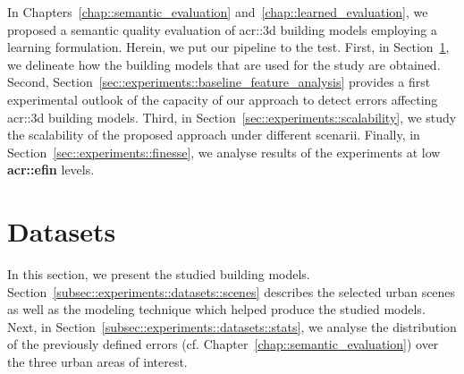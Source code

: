 \minitoc

\vfill

In Chapters~\ref{chap::semantic_evaluation} and~\ref{chap::learned_evaluation}, we proposed a semantic quality evaluation of \gls{acr::3d} building models employing a learning formulation.
Herein, we put our pipeline to the test.
First, in Section~\ref{sec::experiments::datasets}, we delineate how the building models that are used for the study are obtained.
Second, Section~\ref{sec::experiments::baseline_feature_analysis} provides a first experimental outlook of the capacity of our approach to detect errors affecting \gls{acr::3d} building models.
Third, in Section~\ref{sec::experiments::scalability}, we study the scalability of the proposed approach under different scenarii.
Finally, in Section~\ref{sec::experiments::finesse}, we analyse results of the experiments at low \textbf{\gls{acr::efin}} levels.

\clearpage

\section{Datasets}
    \label{sec::experiments::datasets}
    In this section, we present the studied building models.
    Section~\ref{subsec::experiments::datasets::scenes} describes the selected urban scenes as well as the modeling technique which helped produce the studied models.
    Next, in Section~\ref{subsec::experiments::datasets::stats}, we analyse the distribution of the previously defined errors (cf. Chapter~\ref{chap::semantic_evaluation}) over the three urban areas of interest.
    
